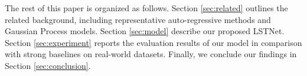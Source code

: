      The rest of this paper is organized as follows. Section \ref{sec:related} outlines the related background, including representative auto-regressive methods and Gaussian Process models. Section \ref{sec:model} describe our proposed LSTNet. Section \ref{sec:experiment} reports the evaluation results of our model in comparison with strong baselines on real-world datasets. Finally, we conclude our findings in Section \ref{sec:conclusion}.
       
     